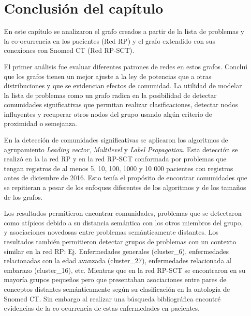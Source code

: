 \section{Conclusión del capítulo}
En este capítulo se analizaron el grafo creados a partir de la lista de problemas y la co-ocurrencia en los pacientes (Red \acrshort{RP}) y el grafo extendido con sus conexiones con Snomed CT (Red \acrshort{RP-SCT}).

El primer análisis fue evaluar diferentes patrones de redes en estos grafos. Concluí que los grafos tienen un mejor ajuste a la ley de potencias que a otras distribuciones y que se evidencian efectos de comunidad. La utilidad de modelar la lista de problemas como un grafo radica en la posibilidad de detectar comunidades significativas que permitan realizar clasificaciones, detectar nodos influyentes y recuperar otros nodos del grupo usando algún criterio de proximidad o semejanza.

En la detección de comunidades significativas se aplicaron los algoritmos de agrupamiento \textit{Leading vector}, \textit{Multilevel} y \textit{Label Propagation}. Esta detección se realizó en la la red \acrshort{RP} y en la red  \acrshort{RP-SCT} conformada por problemas que tengan registros de al menos 5, 10, 100, 1000 y 10 000 pacientes con registros antes de diciembre de 2016. Esto tenía el propósito de encontrar comunidades que se repitieran a pesar de los enfoques diferentes de los algoritmos y de los tamaños de los grafos. 

Los resultados permitieron encontrar comunidades, problemas que se detectaron como atípicos debido a su distancia semántica con los otros miembros del grupo, y asociaciones novedosas entre problemas semánticamente distantes.  Los resultados también permitieron detectar grupos de problemas con un contexto similar en la red \acrshort{RP}: Ej. Enfermedades generales (cluster\_6), enfermedades relacionadas con la edad avanzada (cluster\_27), enfermedades relacionada al embarazo (cluster\_16), etc. Mientras que en la red \acrshort{RP-SCT} se encontraron en su mayoría grupos pequeños pero que presentaban asociaciones entre pares de conceptos distantes semánticamente según su clasificación en la ontología de Snomed CT. Sin embargo al realizar una búsqueda bibliográfica encontré evidencias de la co-ocurrencia de estas enfermedades en pacientes.

